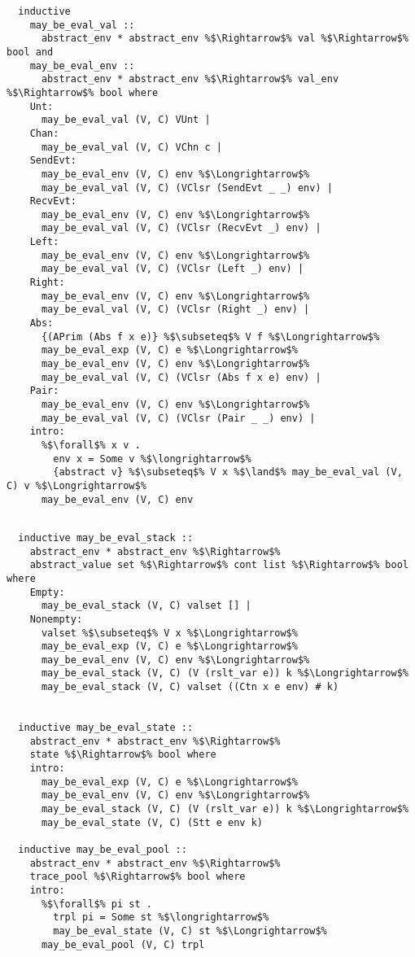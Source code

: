 \documentclass{article}
\begin{document}
\begin{lstlisting}[style=codestyle1, escapechar=\%]



  inductive 
    may_be_eval_val ::
      abstract_env * abstract_env %$\Rightarrow$% val %$\Rightarrow$% bool and  
    may_be_eval_env ::
      abstract_env * abstract_env %$\Rightarrow$% val_env %$\Rightarrow$% bool where
    Unt:
      may_be_eval_val (V, C) VUnt |
    Chan:
      may_be_eval_val (V, C) VChn c |
    SendEvt:
      may_be_eval_env (V, C) env %$\Longrightarrow$%
      may_be_eval_val (V, C) (VClsr (SendEvt _ _) env) |
    RecvEvt:
      may_be_eval_env (V, C) env %$\Longrightarrow$%
      may_be_eval_val (V, C) (VClsr (RecvEvt _) env) |
    Left:
      may_be_eval_env (V, C) env %$\Longrightarrow$%
      may_be_eval_val (V, C) (VClsr (Left _) env) |
    Right:
      may_be_eval_env (V, C) env %$\Longrightarrow$%
      may_be_eval_val (V, C) (VClsr (Right _) env) |
    Abs:
      {(APrim (Abs f x e)} %$\subseteq$% V f %$\Longrightarrow$% 
      may_be_eval_exp (V, C) e %$\Longrightarrow$% 
      may_be_eval_env (V, C) env %$\Longrightarrow$%
      may_be_eval_val (V, C) (VClsr (Abs f x e) env) |
    Pair:
      may_be_eval_env (V, C) env %$\Longrightarrow$%
      may_be_eval_val (V, C) (VClsr (Pair _ _) env) |
    intro:  
      %$\forall$% x v .
        env x = Some v %$\longrightarrow$%
        {abstract v} %$\subseteq$% V x %$\land$% may_be_eval_val (V, C) v %$\Longrightarrow$%
      may_be_eval_env (V, C) env

  \end{lstlisting}
\begin{lstlisting}[style=codestyle1, escapechar=\%]

  inductive may_be_eval_stack ::
    abstract_env * abstract_env %$\Rightarrow$%
    abstract_value set %$\Rightarrow$% cont list %$\Rightarrow$% bool where
    Empty:
      may_be_eval_stack (V, C) valset [] |
    Nonempty: 
      valset %$\subseteq$% V x %$\Longrightarrow$%
      may_be_eval_exp (V, C) e %$\Longrightarrow$%
      may_be_eval_env (V, C) env %$\Longrightarrow$%
      may_be_eval_stack (V, C) (V (rslt_var e)) k %$\Longrightarrow$%
      may_be_eval_stack (V, C) valset ((Ctn x e env) # k)


  inductive may_be_eval_state ::
    abstract_env * abstract_env %$\Rightarrow$%
    state %$\Rightarrow$% bool where
    intro:
      may_be_eval_exp (V, C) e %$\Longrightarrow$%
      may_be_eval_env (V, C) env %$\Longrightarrow$%
      may_be_eval_stack (V, C) (V (rslt_var e)) k %$\Longrightarrow$%
      may_be_eval_state (V, C) (Stt e env k)

  inductive may_be_eval_pool ::
    abstract_env * abstract_env %$\Rightarrow$%
    trace_pool %$\Rightarrow$% bool where
    intro:
      %$\forall$% pi st .
        trpl pi = Some st %$\longrightarrow$%
        may_be_eval_state (V, C) st %$\Longrightarrow$% 
      may_be_eval_pool (V, C) trpl

  \end{lstlisting}
\end{document}
